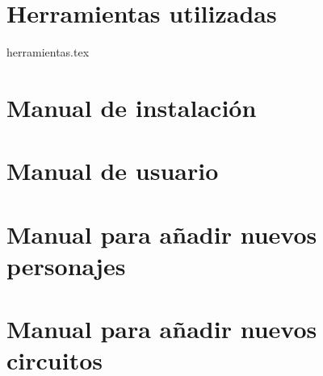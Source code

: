 \appendix
\chapter{Herramientas utilizadas}
 {herramientas.tex}
\chapter{Manual de instalación}

\chapter{Manual de usuario}

\chapter{Manual para añadir nuevos personajes}

\chapter{Manual para añadir nuevos circuitos}


